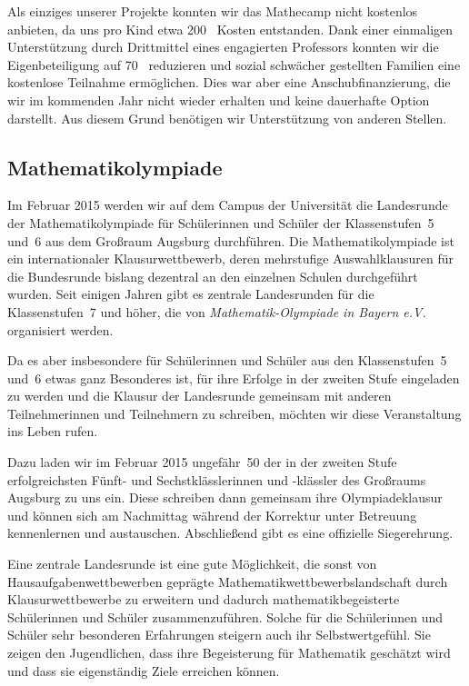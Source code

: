 \documentclass[12pt]{zettel}
\begin{document}
Als einziges unserer Projekte konnten wir das Mathecamp nicht kostenlos
anbieten, da uns pro Kind etwa 200~\texteuro{} Kosten entstanden. Dank
einer einmaligen Unterstützung durch Drittmittel eines
engagierten Professors konnten wir die Eigenbeteiligung auf 70~\texteuro{}
reduzieren und sozial schwächer gestellten Familien eine kostenlose Teilnahme
ermöglichen. Dies war aber eine Anschubfinanzierung, die wir im kommenden Jahr
nicht wieder erhalten und keine dauerhafte Option darstellt. Aus diesem Grund
benötigen wir Unterstützung von anderen Stellen.


\subsection{Mathematikolympiade}

Im Februar 2015 werden wir auf dem Campus der Universität die Landesrunde der Mathematikolympiade für Schülerinnen und Schüler der Klassenstufen~5 und~6 aus dem Großraum
Augsburg durchführen. Die Mathematikolympiade ist ein internationaler Klausurwettbewerb, deren mehrstufige Auswahlklausuren für die Bundesrunde
bislang dezentral an den einzelnen Schulen durchgeführt wurden. Seit einigen
Jahren gibt es zentrale Landesrunden für die Klassenstufen~7 und höher, die von
\emph{Mathematik-Olympiade in Bayern e.V.} organisiert werden.

Da es aber insbesondere für Schülerinnen und Schüler aus den Klassenstufen~5
und~6 etwas ganz Besonderes ist, für ihre Erfolge in der zweiten Stufe
eingeladen zu werden und die Klausur der Landesrunde gemeinsam mit anderen
Teilnehmerinnen und Teilnehmern zu schreiben, möchten wir diese Veranstaltung
ins Leben rufen.

Dazu laden wir im Februar 2015 ungefähr~50 der in der zweiten Stufe
erfolgreichsten Fünft- und Sechstklässlerinnen und -klässler des Großraums
Augsburg zu uns ein. Diese schreiben dann gemeinsam ihre Olympiadeklausur und
können sich am Nachmittag während der Korrektur unter Betreuung kennenlernen
und austauschen. Abschließend gibt es eine offizielle Siegerehrung.

Eine zentrale Landesrunde ist eine gute Möglichkeit, die sonst von
Hausaufgabenwettbewerben geprägte Mathematikwettbewerbslandschaft durch
Klausurwettbewerbe zu erweitern und dadurch mathematikbegeisterte Schülerinnen
und Schüler zusammenzuführen. Solche für die Schülerinnen und Schüler
sehr besonderen Erfahrungen steigern auch ihr Selbstwertgefühl. Sie zeigen
den Jugendlichen, dass ihre Begeisterung für Mathematik geschätzt wird und dass sie eigenständig Ziele erreichen können.
\end{document}
